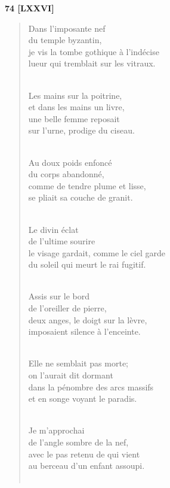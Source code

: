 \documentclass[a4paper,11pt]{book}
\begin{document}
\bigskip

\begin{center} {\bf 74 [LXXVI]} \end{center}

\begin{verse}
Dans l'imposante nef \\
du temple byzantin, \\
je vis la tombe gothique à l'indécise \\
lueur qui tremblait sur les vitraux. \\ \

Les mains sur la poitrine, \\
et dans les mains un livre, \\
une belle femme reposait \\
sur l'urne, prodige du ciseau. \\ \

Au doux poids enfoncé \\
du corps abandonné, \\
comme de tendre plume et lisse, \\
se pliait sa couche de granit. \\ \

Le divin éclat \\
de l'ultime sourire \\
le visage gardait, comme le ciel garde \\
du soleil qui meurt le rai fugitif. \\ \

Assis sur le bord \\
de l'oreiller de pierre, \\
deux anges, le doigt sur la lèvre, \\
imposaient silence à l'enceinte. \\ \

Elle ne semblait pas morte; \\
on l'aurait dit dormant \\
dans la pénombre des arcs massifs \\
et en songe voyant le paradis. \\ \

Je m'approchai \\
de l'angle sombre de la nef, \\
avec le pas retenu de qui vient \\
au berceau d'un enfant assoupi. \\ \


\end{verse}
\end{document}
